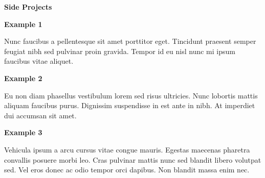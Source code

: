 \documentclass[12pt]{article}
\newcommand{\Section}[1]{
    \begingroup
    \color{blue}\Large\bfseries
    \vspace{4mm plus .5mm minus .5mm}
    #1
    \par
    \vspace{4mm plus .5mm minus .5mm}
    \endgroup
}
\newcommand{\Subsection}[1]{
    \begingroup
    \color{black}\normalsize\bfseries
    #1
    \par
    \vspace{1mm plus .25mm minus .25mm}
    \endgroup
}
\newcommand{\Content}[1]{
    #1
    \par
    \vspace{2mm plus .5mm minus .5mm}
}
\begin{document}
\begin{paracol}{2}
    \Section{Side Projects}
    \Subsection{Example 1}
    \Content{Nunc faucibus a pellentesque sit amet porttitor eget. Tincidunt praesent semper feugiat nibh sed pulvinar proin gravida. Tempor id eu nisl nunc mi ipsum faucibus vitae aliquet.}
    \Subsection{Example 2}
    \Content{Eu non diam phasellus vestibulum lorem sed risus ultricies. Nunc lobortis mattis aliquam faucibus purus. Dignissim suspendisse in est ante in nibh. At imperdiet dui accumsan sit amet.}
    \Subsection{Example 3}
    \Content{Vehicula ipsum a arcu cursus vitae congue mauris. Egestas maecenas pharetra convallis posuere morbi leo. Cras pulvinar mattis nunc sed blandit libero volutpat sed. Vel eros donec ac odio tempor orci dapibus. Non blandit massa enim nec.}

\end{paracol}
\end{document}
